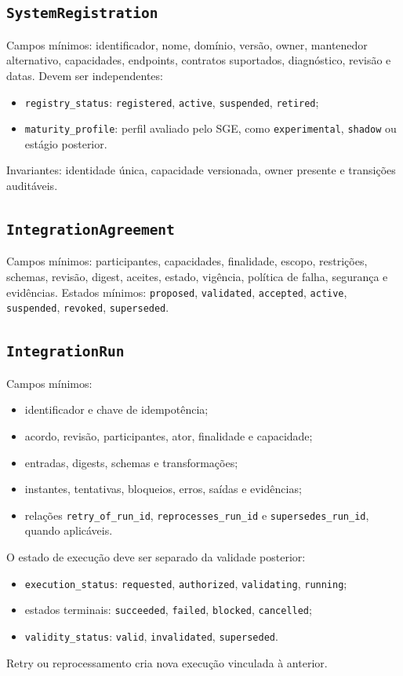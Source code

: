 \documentclass[11pt,a4paper,oneside]{article}
\begin{document}
\subsection{\texttt{SystemRegistration}}
Campos mínimos: identificador, nome, domínio, versão, owner, mantenedor alternativo, capacidades, endpoints, contratos suportados, diagnóstico, revisão e datas. Devem ser independentes:
\begin{itemize}
  \item \texttt{registry\_status}: \texttt{registered}, \texttt{active}, \texttt{suspended}, \texttt{retired};
  \item \texttt{maturity\_profile}: perfil avaliado pelo SGE, como \texttt{experimental}, \texttt{shadow} ou estágio posterior.
\end{itemize}
Invariantes: identidade única, capacidade versionada, owner presente e transições auditáveis.

\subsection{\texttt{IntegrationAgreement}}
Campos mínimos: participantes, capacidades, finalidade, escopo, restrições, schemas, revisão, digest, aceites, estado, vigência, política de falha, segurança e evidências. Estados mínimos: \texttt{proposed}, \texttt{validated}, \texttt{accepted}, \texttt{active}, \texttt{suspended}, \texttt{revoked}, \texttt{superseded}.

\subsection{\texttt{IntegrationRun}}
Campos mínimos:
\begin{itemize}
  \item identificador e chave de idempotência;
  \item acordo, revisão, participantes, ator, finalidade e capacidade;
  \item entradas, digests, schemas e transformações;
  \item instantes, tentativas, bloqueios, erros, saídas e evidências;
  \item relações \texttt{retry\_of\_run\_id}, \texttt{reprocesses\_run\_id} e \texttt{supersedes\_run\_id}, quando aplicáveis.
\end{itemize}
O estado de execução deve ser separado da validade posterior:
\begin{itemize}
  \item \texttt{execution\_status}: \texttt{requested}, \texttt{authorized}, \texttt{validating}, \texttt{running};
  \item estados terminais: \texttt{succeeded}, \texttt{failed}, \texttt{blocked}, \texttt{cancelled};
  \item \texttt{validity\_status}: \texttt{valid}, \texttt{invalidated}, \texttt{superseded}.
\end{itemize}
Retry ou reprocessamento cria nova execução vinculada à anterior.
\end{document}
